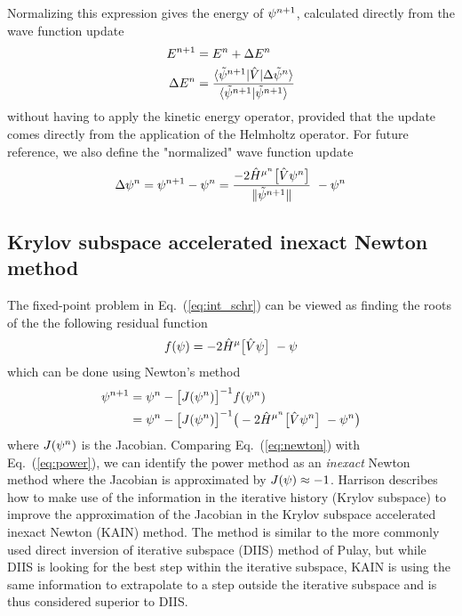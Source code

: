 Normalizing this expression gives the energy of $\psi^{n+1}$, calculated directly from
the wave function update
\begin{align}
    E^{n+1} &= E^{n} + \Delta E^n\\
    \label{eq:energy_update}
    \Delta E^n &= 
	\frac{\langle\tilde{\psi}^{n+1}| \hat{V} |\Delta\tilde{\psi}^{n}\rangle}
	{\langle\tilde{\psi}^{n+1}|\tilde{\psi}^{n+1}\rangle}
\end{align}
without having to apply the kinetic energy operator, provided that the update comes directly 
from the application of the Helmholtz operator. For future reference, we also define the 
"normalized" wave function update 
\begin{equation}
    \label{eq:wavefunction_update}
    \Delta\wavefunction^n = \wavefunction^{n+1} - \wavefunction^n = 
	\frac{-2\hat{H}^{\mu^n}\big[\hat{V}\wavefunction^n\big]}{\|\tilde{\wavefunction}^{n+1}\|} 
	- \wavefunction^n
\end{equation}

\subsection{Krylov subspace accelerated inexact Newton method}
The fixed-point problem in Eq.~(\ref{eq:int_schr}) can be viewed as finding 
the roots of the the following residual function
\begin{equation}
    f(\wavefunction) =  -2 \hat{H}^{\mu}\big[\hat{V}\wavefunction\big] - \wavefunction
\end{equation}
which can be done using Newton's method
\begin{align}
    \wavefunction^{n+1}	&= \wavefunction^n - \big[J(\wavefunction^n)\big]^{-1}f(\wavefunction^n)\\
    \label{eq:newton}
	&= \wavefunction^n - \big[J(\wavefunction^n)\big]^{-1}
	    \big(-2\hat{H}^{\mu^n}\big[\hat{V}\wavefunction^n\big] - \wavefunction^n\big)
\end{align}
where $J(\psi^n)$ is the Jacobian. Comparing Eq.~(\ref{eq:newton}) with 
Eq.~(\ref{eq:power}), we can identify the power method as an \emph{inexact} 
Newton method where the Jacobian is approximated by $J(\psi) \approx -1$.
Harrison\cite{Harrison_kain:2004} describes how to make use of the information in the
iterative history (Krylov subspace) to improve the approximation of the 
Jacobian in the Krylov subspace accelerated inexact Newton (KAIN) method. The method 
is similar to the more commonly used direct inversion of iterative subspace 
(DIIS) method of Pulay\cite{Pulay:1980}, but while DIIS is looking for the best 
step within the iterative subspace, KAIN is using the same information to 
extrapolate to a step outside the iterative subspace and is thus considered 
superior to DIIS\cite{Harrison_kain:2004}.

